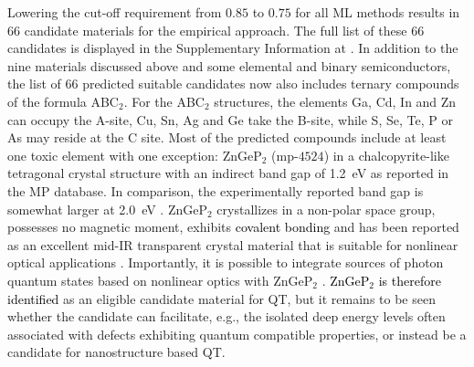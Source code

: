 \documentclass[superscriptaddress,unsortedaddress,
 amsmath,amssymb,
 aps,
]{revtex4-2}
\newcommand{\mrk}[1]{\textcolor{black}{#1}}
\begin{document}
Lowering the cut-off requirement from $0.85$ to $0.75$ for all ML methods results in $66$ candidate materials for the empirical approach.  
The full list of these $66$ candidates is displayed in the Supplementary Information at \cite{supplementary}. 
In addition to the nine materials discussed above and some elemental and binary semiconductors, the list of $66$ predicted suitable candidates now also includes ternary compounds of the formula ABC$_2$. For the ABC$_2$ structures, the elements Ga, Cd, In and Zn can occupy the A-site, Cu, Sn, Ag and Ge take the B-site, while S, Se, Te, P or As may reside at the C site. Most of the predicted compounds include at least one toxic element with one exception: ZnGeP$_2$ (mp-$4524$) in a chalcopyrite-like tetragonal crystal structure with an indirect band gap of \SI{1.2}{\electronvolt} \cite{Zhang2015} as reported in the MP database. In comparison, the experimentally reported band gap is somewhat larger at \SI{2.0}{\electronvolt} \cite{Xing1989}. 
ZnGeP$_2$ crystallizes in a non-polar space group, possesses no magnetic moment, exhibits  \mrk{covalent bonding} and has been reported as an excellent mid-IR transparent crystal material that is suitable for nonlinear optical applications \cite{Zhang2015}. Importantly, it is possible to integrate sources of photon quantum states based on nonlinear optics with ZnGeP$_2$ \cite{Caspani2017}. 
\mrk{ZnGeP$_2$ is therefore identified} as an eligible candidate material for QT, but it remains to be seen whether the candidate can facilitate, e.g., the isolated deep energy levels often associated with defects exhibiting quantum compatible properties, or instead be a candidate for nanostructure based QT.  
\end{document}

